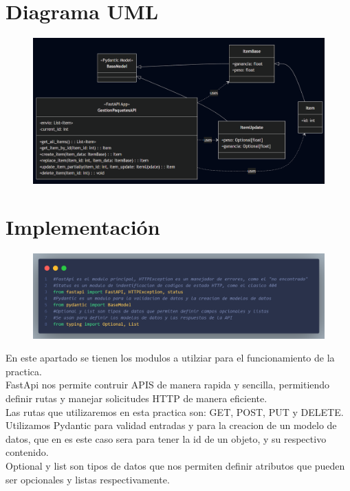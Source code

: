 \documentclass[12pt]{article}
\begin{document}
\section{Diagrama UML}
\begin{figure}[H]
    \centering
    \includegraphics[width=1\textwidth]{Imagenes/Diagrama UML.png}
\end{figure}
\section{Implementación}
\begin{figure}[h!]
    \centering
    \includegraphics[width=1\textwidth]{Imagenes/Captura1_librerias.png}
\end{figure}

En este apartado se tienen los modulos a utilziar para el funcionamiento de la practica.\\
FastApi nos permite contruir APIS de manera rapida y sencilla, permitiendo definir rutas y manejar solicitudes HTTP de manera eficiente.\\
Las rutas que utilizaremos en esta practica son: GET, POST, PUT y DELETE.\\
Utilizamos Pydantic para validad entradas y para la creacion de un modelo de datos, que en es este caso sera para tener la id de un objeto, y su respectivo contenido.\\
Optional y list son tipos de datos que nos permiten definir atributos que pueden ser opcionales y listas respectivamente.\\
\end{document}
